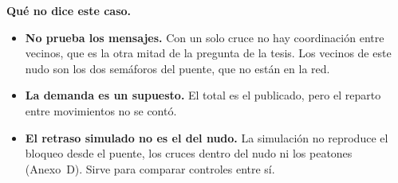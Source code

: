 \noindent\textbf{Qué no dice este caso.}
\begin{itemize}
  \item \textbf{No prueba los mensajes.} Con un solo cruce no hay
    coordinación entre vecinos, que es la otra mitad de la pregunta de
    la tesis. Los vecinos de este nudo son los dos semáforos del puente,
    que no están en la red.
  \item \textbf{La demanda es un supuesto.} El total es el publicado,
    pero el reparto entre movimientos no se contó.
  \item \textbf{El retraso simulado no es el del nudo.} La simulación
    no reproduce el bloqueo desde el puente, los cruces dentro del nudo
    ni los peatones (Anexo~D). Sirve para comparar controles entre sí.
\end{itemize}
